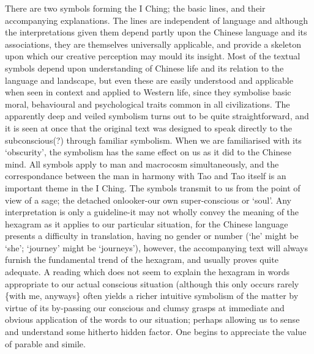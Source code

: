 \documentclass[11pt]{book}
\begin{document}
There are two symbols forming the I Ching; the basic lines, and their accompanying explanations. The lines are independent of language and although the interpretations given them depend partly upon the Chinese language and its associations, they are themselves universally applicable, and provide a skeleton upon which our creative perception may mould its insight. Most of the textual symbols depend upon understanding of Chinese life and its relation to the language and landscape, but even these are easily understood and applicable when seen in context and applied to Western life, since they symbolise basic moral, behavioural and psychological traits common in all civilizations. The apparently deep and veiled symbolism turns out to be quite straightforward, and it is seen at once that the original text was designed to speak directly to the subconscious(?) through familiar symbolism. When we are familiarised with its `obscurity', the symbolism has the same effect on us as it did to the Chinese mind. All symbols apply to man and macrocosm simultaneously, and the correspondance between the man in harmony with Tao and Tao itself is an important theme in the I Ching. The symbols transmit to us from the point of view of a sage; the detached onlooker-our own super-conscious or `soul'. Any interpretation is only a guideline-it may not wholly convey the meaning of the hexagram as it applies to our particular situation, for the Chinese language presents a difficulty in translation, having no gender or number (`he' might be `she'; `journey' might be `journeys'), however, the accompanying text will always furnish the fundamental trend of the hexagram, and usually proves quite adequate. A reading which does not seem to explain the hexagram in words appropriate to our actual conscious situation (although this only occurs rarely \{with me, anyways\} often yields a richer intuitive symbolism of the matter by virtue of its by-passing our conscious and clumsy grasps at immediate and obvious application of the words to our situation; perhaps allowing us to sense and understand some hitherto hidden factor. One begins to appreciate the value of parable and simile.
\end{document}
